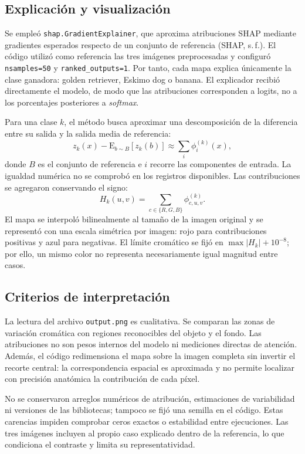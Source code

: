 \documentclass[10pt,a4paper,twocolumn]{article}
\begin{document}
\subsection{Explicación y visualización}
Se empleó \texttt{shap.GradientExplainer}, que aproxima atribuciones SHAP mediante gradientes esperados respecto de un conjunto de referencia (SHAP, s.\,f.). El código utilizó como referencia las tres imágenes preprocesadas y configuró \texttt{nsamples=50} y \texttt{ranked\_outputs=1}. Por tanto, cada mapa explica únicamente la clase ganadora: golden retriever, Eskimo dog o banana. El explicador recibió directamente el modelo, de modo que las atribuciones corresponden a logits, no a los porcentajes posteriores a \textit{softmax}.

Para una clase $k$, el método busca aproximar una descomposición de la diferencia entre su salida y la salida media de referencia:
\begin{equation}
z_k(x)-\mathrm{E}_{b\sim B}[z_k(b)]
\approx \sum_i \phi_i^{(k)}(x),
\end{equation}
donde $B$ es el conjunto de referencia e $i$ recorre las componentes de entrada. La igualdad numérica no se comprobó en los registros disponibles. Las contribuciones se agregaron conservando el signo:
\begin{equation}
H_k(u,v)=\sum_{c\in\{R,G,B\}}\phi_{c,u,v}^{(k)}.
\end{equation}
El mapa se interpoló bilinealmente al tamaño de la imagen original y se representó con una escala simétrica por imagen: rojo para contribuciones positivas y azul para negativas. El límite cromático se fijó en $\max|H_k|+10^{-8}$; por ello, un mismo color no representa necesariamente igual magnitud entre casos.

\subsection{Criterios de interpretación}
La lectura del archivo \texttt{output.png} es cualitativa. Se comparan las zonas de variación cromática con regiones reconocibles del objeto y el fondo. Las atribuciones no son pesos internos del modelo ni mediciones directas de atención. Además, el código redimensiona el mapa sobre la imagen completa sin invertir el recorte central: la correspondencia espacial es aproximada y no permite localizar con precisión anatómica la contribución de cada píxel.

No se conservaron arreglos numéricos de atribución, estimaciones de variabilidad ni versiones de las bibliotecas; tampoco se fijó una semilla en el código. Estas carencias impiden comprobar ceros exactos o estabilidad entre ejecuciones. Las tres imágenes incluyen al propio caso explicado dentro de la referencia, lo que condiciona el contraste y limita su representatividad.
\end{document}
